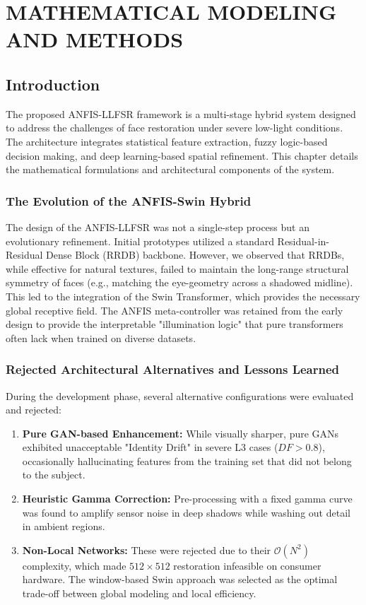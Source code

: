 \chapter{MATHEMATICAL MODELING AND METHODS}

\section{Introduction}
The proposed ANFIS-LLFSR framework is a multi-stage hybrid system designed to address the challenges of face restoration under severe low-light conditions. The architecture integrates statistical feature extraction, fuzzy logic-based decision making, and deep learning-based spatial refinement. This chapter details the mathematical formulations and architectural components of the system.

\subsection{The Evolution of the ANFIS-Swin Hybrid}
The design of the ANFIS-LLFSR was not a single-step process but an evolutionary refinement. Initial prototypes utilized a standard Residual-in-Residual Dense Block (RRDB) backbone. However, we observed that RRDBs, while effective for natural textures, failed to maintain the long-range structural symmetry of faces (e.g., matching the eye-geometry across a shadowed midline). This led to the integration of the Swin Transformer, which provides the necessary global receptive field. The ANFIS meta-controller was retained from the early design to provide the interpretable "illumination logic" that pure transformers often lack when trained on diverse datasets.

\subsection{Rejected Architectural Alternatives and Lessons Learned}
During the development phase, several alternative configurations were evaluated and rejected:
\begin{enumerate}
    \item \textbf{Pure GAN-based Enhancement:} While visually sharper, pure GANs exhibited unacceptable "Identity Drift" in severe L3 cases ($DF > 0.8$), occasionally hallucinating features from the training set that did not belong to the subject.
    \item \textbf{Heuristic Gamma Correction:} Pre-processing with a fixed gamma curve was found to amplify sensor noise in deep shadows while washing out detail in ambient regions.
    \item \textbf{Non-Local Networks:} These were rejected due to their $\mathcal{O}(N^2)$ complexity, which made $512 \times 512$ restoration infeasible on consumer hardware. The window-based Swin approach was selected as the optimal trade-off between global modeling and local efficiency.
\end{enumerate}

